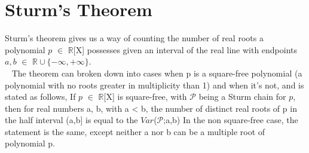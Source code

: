 \documentclass[a4paper]{article}
\begin{document}
\section{Sturm's Theorem}
Sturm's theorem gives us a way of counting the number of real roots a polynomial $p$ $\in$ $\mathbb{R}$[X] possesses given an interval of the real line with endpoints $a, b$ $\in$ $\mathbb{R} \cup\{-\infty, +\infty\}$.
\\~
The theorem can broken down into cases when p is a square-free polynomial (a polynomial with no roots greater in multiplicity than 1) and when it's not, and is stated as follows,
\newline \newline
If $p$ $\in$ $\mathbb{R}$[X] is square-free, with $\mathcal{P}$ being a Sturm chain for $p$, then for real numbers a, b, with a < b, the number of distinct real roots of p in the half interval (a,b] is equal to the $Var$($\mathcal{P}$;a,b)\newline
In the non square-free case, the statement is the same, except neither a nor b can be a multiple root of polynomial p.
\end{document}
